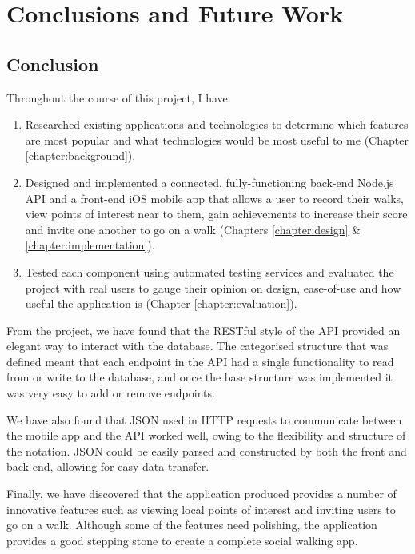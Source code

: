 \chapter{Conclusions and Future Work}

\section{Conclusion}

Throughout the course of this project, I have:

\begin{enumerate}
  \item Researched existing applications and technologies to determine which features are most popular and what technologies would be most useful to me (Chapter \ref{chapter:background}).
  \item Designed and implemented a connected, fully-functioning back-end Node.js API and a front-end iOS mobile app that allows a user to record their walks, view points of interest near to them, gain achievements to increase their score and invite one another to go on a walk (Chapters \ref{chapter:design} \& \ref{chapter:implementation}).
  \item Tested each component using automated testing services and evaluated the project with real users to gauge their opinion on design, ease-of-use and how useful the application is (Chapter \ref{chapter:evaluation}).
\end{enumerate}

From the project, we have found that the RESTful style of the API provided an elegant way to interact with the database. The categorised structure that was defined meant that each endpoint in the API had a single functionality to read from or write to the database, and once the base structure was implemented it was very easy to add or remove endpoints.

We have also found that JSON used in HTTP requests to communicate between the mobile app and the API worked well, owing to the flexibility and structure of the notation. JSON could be easily parsed and constructed by both the front and back-end, allowing for easy data transfer.

Finally, we have discovered that the application produced provides a number of innovative features such as viewing local points of interest and inviting users to go on a walk. Although some of the features need polishing, the application provides a good stepping stone to create a complete social walking app.

